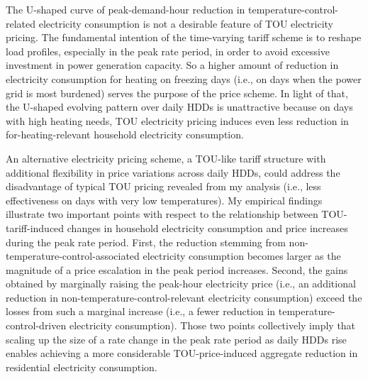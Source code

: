 The U-shaped curve of peak-demand-hour reduction in temperature-control-related electricity consumption is not a desirable feature of TOU electricity pricing. The fundamental intention of the time-varying tariff scheme is to reshape load profiles, especially in the peak rate period, in order to avoid excessive investment in power generation capacity. So a higher amount of reduction in electricity consumption for heating on freezing days (i.e., on days when the power grid is most burdened) serves the purpose of the price scheme. In light of that, the U-shaped evolving pattern over daily HDDs is unattractive because on days with high heating needs, TOU electricity pricing induces even less reduction in for-heating-relevant household electricity consumption. 

An alternative electricity pricing scheme, a TOU-like tariff structure with additional flexibility in price variations across daily HDDs, could address the disadvantage of typical TOU pricing revealed from my analysis (i.e., less effectiveness on days with very low temperatures). My empirical findings illustrate two important points with respect to the relationship between TOU-tariff-induced changes in household electricity consumption and price increases during the peak rate period. First, the reduction stemming from non-temperature-control-associated electricity consumption becomes larger as the magnitude of a price escalation in the peak period increases. Second, the gains obtained by marginally raising the peak-hour electricity price (i.e., an additional reduction in non-temperature-control-relevant electricity consumption) exceed the losses from such a marginal increase (i.e., a fewer reduction in temperature-control-driven electricity consumption). Those two points collectively imply that scaling up the size of a rate change in the peak rate period as daily HDDs rise enables achieving a more considerable TOU-price-induced aggregate reduction in residential electricity consumption. 
 
